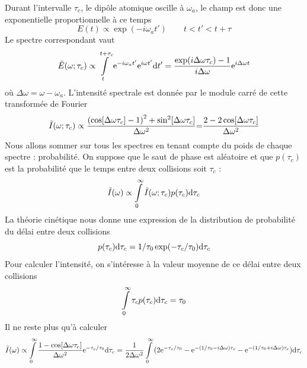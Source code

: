 	 Durant l'intervalle $\tau_c$, le dipôle atomique oscille à $\omega_a$, le champ est donc 
	 une exponentielle proportionnelle à ce temps
	 \begin{equation}
	 E(t) \propto\exp(-i\omega_at')\qquad t<t'<t+\tau
	 \end{equation}
	 Le spectre correspondant vaut
	 \begin{equation}
	 \tilde E(\omega ;{\tau _c}) \propto \int\limits_t^{t + {\tau _c}} {{{\rm{e}}^{ - i{\omega _a}t'}}} {{\rm{e}}^{i\omega t'}}{\rm{d}}t' = \frac{{{\rm{exp(}}i\Delta \omega {\tau _c}{\rm{)}} - 1}}{{i\Delta \omega }}{{\rm{e}}^{i\Delta \omega t}}{\rm{ }}
	 \end{equation}
	 où $\Delta\omega = \omega-\omega_a$. L'intensité spectrale est donnée par le module carré de 
	 cette transformée de Fourier
	 \begin{equation}
	 \tilde I(\omega ;{\tau _c}) \propto \frac{{{{(\cos [\Delta \omega {\tau _c}] - 1)}^2} + {{\sin }^2}[\Delta \omega {\tau _c}]}}{{\Delta {\omega ^2}}}{\rm{  = }}\frac{{2 - 2\cos [\Delta \omega {\tau _c}]}}{{\Delta {\omega ^2}}}
	 \end{equation}
	 Nous allons sommer sur tous les spectres en tenant compte du poids de chaque spectre : 
	 probabilité. On suppose que le saut de phase est aléatoire et que $p(\tau_c)$ est la 
	 probabilité que le temps entre deux collisions soit $\tau_c$ :
	 \begin{equation}
	  \tilde I(\omega ) \propto \int\limits_0^\infty  {\tilde I(\omega ;{\tau _c})p({\tau _c}){\rm{d}}{\tau _c}}
	 \end{equation}
	 La théorie cinétique nous donne une expression de la distribution de probabilité du délai entre
	 deux collisions 
	 \begin{equation}
	 p({\tau _c}){\rm{d}}{\tau _c} = 1/{\tau _0}\exp ( - {\tau _c}/{\tau _0}){\rm{d}}{\tau _c}
	 \end{equation}
	 Pour calculer l'intensité, on s'intéresse à la valeur moyenne de ce délai entre deux collisions
	 \begin{equation}
	 \int\limits_0^\infty  {{\tau _c}p({\tau _c}){\rm{d}}{\tau _c}}  = {\tau _0}
	 \end{equation}
	 Il ne reste plus qu'à calculer
	 \begin{equation}
	 \tilde I(\omega ) \propto \int\limits_0^\infty  {\frac{{1 - \cos [\Delta \omega {\tau _c}]}}{{\Delta {\omega ^2}}}{{\rm{e}}^{ - {\tau _c}/{\tau _0}}}{\rm{d}}{\tau _c}} 
	 = \frac{1}{{2\Delta {\omega ^2}}}\int\limits_0^\infty  {(2{{\rm{e}}^{ - {\tau _c}/{\tau _0}}} - {{\rm{e}}^{ - (1/{\tau _0} - i\Delta \omega ){\tau _c}}} - {{\rm{e}}^{ - (1/{\tau _0} + i\Delta \omega ){\tau _c}}}){\rm{d}}{\tau _c}}
	 \end{equation}
